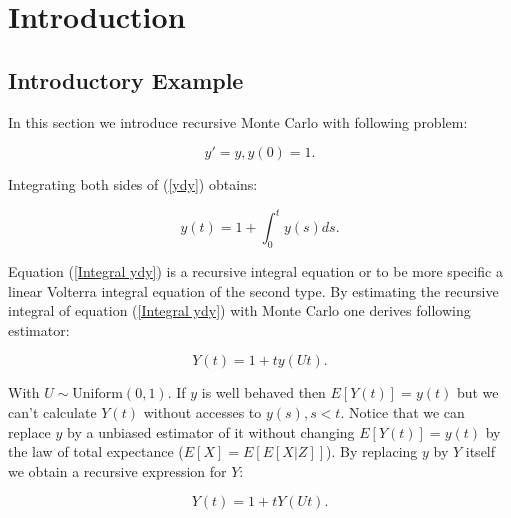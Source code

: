 \documentclass[a4paper,12pt]{article}
\begin{document}

\newpage
\tableofcontents
\newpage

\begin{abstract}
    We will write this at the end. Also need a dutch abstract
\end{abstract}

\section{Introduction}

\subsection{Introductory Example}
In this section we introduce recursive  Monte Carlo with following problem:

\begin{equation} \label{ydy}
    y'=y, y(0)=1.
\end{equation}

Integrating both sides of (\ref{ydy}) obtains:

\begin{equation} \label{Integral ydy}
    y(t) = 1 + \int_{0}^{t} y(s) ds.
\end{equation}

Equation (\ref{Integral ydy}) is a recursive integral equation or to be more specific
a linear Volterra integral equation of the second type. By estimating the recursive integral
of equation (\ref{Integral ydy}) with Monte Carlo one derives following estimator:

\[
    Y(t) = 1 + t y(Ut)
    .\]

With $U \sim \text{Uniform}(0,1)$. If $y$ is well behaved then $E[Y(t)]=y(t)$ but we can't
calculate $Y(t)$ without accesses to $y(s),s<t$. Notice that we can replace $y$ by a
unbiased estimator of it without changing $E[Y(t)]=y(t)$ by the law of total expectance
($E[X] = E[E[X|Z]]$). By replacing $y$ by $Y$ itself we obtain a recursive expression for $Y$:

\begin{equation}\label{recursive RV}
    Y(t) = 1 + tY(Ut).
\end{equation}
\end{document}
